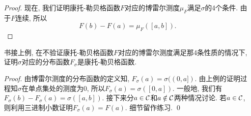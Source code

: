 \begin{proof}
    现在, 我们证明康托-勒贝格函数$F$对应的博雷尔测度$\mu_F$满足$\sigma$的4个条件. 由于$F$连续, 所以
    $$F(b)-F(a) = \mu_F([a,b]). $$ 
\end{proof}

\begin{exercise}
    书接上例, 在不验证康托-勒贝格函数$F$对应的博雷尔测度满足那4条性质的情况下, 证明$\sigma$对应的分布函数$F_\sigma$是康托-勒贝格函数.
\end{exercise}
\begin{proof}
    由博雷尔测度的分布函数的定义知, $F_\sigma(a) = \sigma((0, a])$.
    由上例的证明过程知$\sigma$在单点集处的测度为$0$, 所以$F_\sigma(a) = \sigma([0,a])$.
    一般地, 我们有$F_\sigma(b)-F_\sigma(a) = \sigma([a,b])$. 接下来分$a \in \mathcal{C}$和$a \notin \mathcal{C}$两种情况讨论. 若$a \in \mathcal{C}$, 则利用三进制小数证明$F_\sigma(a) = F(a)$. 细节留作练习. \qed
\end{proof}
